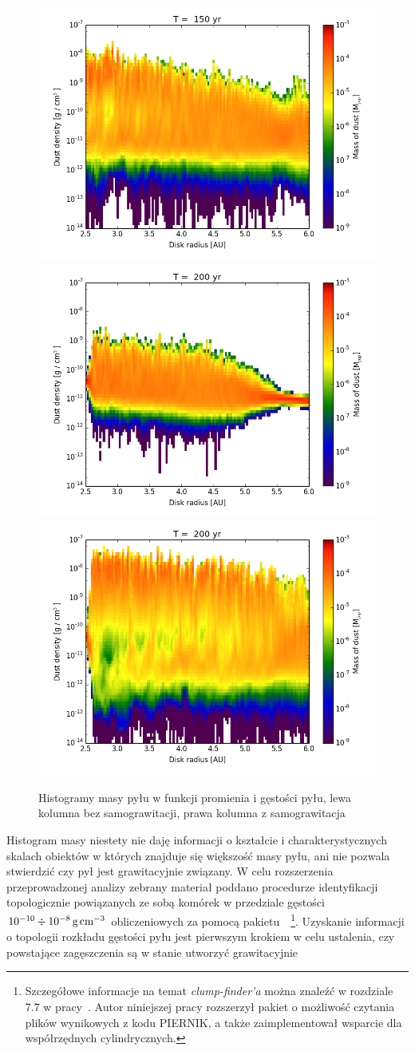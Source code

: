 \begin{figure}
  \includegraphics[width=0.4\linewidth]{figures/hist2d_sg_03.png} \\
  \includegraphics[width=0.4\linewidth]{figures/hist2d_nosg_04.png}
  \includegraphics[width=0.4\linewidth]{figures/hist2d_sg_04.png} 
  \caption{Histogramy masy pyłu w funkcji promienia i gęstości pyłu, lewa
  kolumna bez samograwitacji, prawa kolumna z samograwitacja}
  \label{fig:hists} 
\end{figure}
%
\par Histogram masy niestety nie daję informacji o kształcie i
charakterystycznych skalach obiektów w których znajduje się większość masy pyłu,
ani nie pozwala stwierdzić czy pył jest grawitacyjnie związany. W celu
rozszerzenia przeprowadzonej analizy zebrany materiał poddano procedurze
identyfikacji topologicznie powiązanych ze sobą komórek w przedziale gęstości
$10^{-10}\div10^{-8}\hbox{$\thinspace\textrm{g}$}\hbox{$\thinspace\textrm{cm}$}^{-3}$ obliczeniowych za pomocą
pakietu~\yt{}~\footnote{Szczegółowe informacje na temat
\emph{clump-finder'a} można znaleźć w rozdziale 7.7 w pracy~\cite{yt}. Autor
niniejszej pracy rozszerzył pakiet \yt{} o możliwość czytania plików wynikowych
z kodu PIERNIK, a także zaimplementował wsparcie dla współrzędnych
cylindrycznych.}.
Uzyskanie informacji o topologii rozkładu gęstości pyłu jest pierwszym krokiem
w celu ustalenia, czy powstające zagęszczenia są w stanie utworzyć grawitacyjnie
